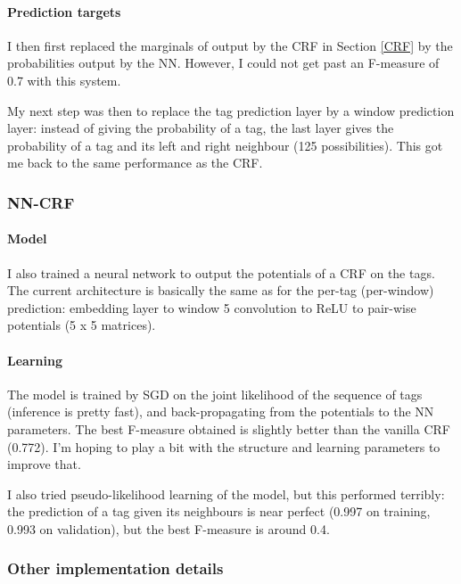 \documentclass[10pt,a4paper]{article}
\begin{document}
  \paragraph{Prediction targets}

  I then first replaced the marginals of output by the CRF in Section \ref{CRF} by the probabilities output by the NN. However, I could not get past an F-measure of 0.7 with this system.
  
  My next step was then to replace the tag prediction layer by a window prediction layer: instead of giving the probability of a tag, the last layer gives the probability of a tag and its left and right neighbour (125 possibilities). This got me back to the same performance as the CRF.

\subsubsection{NN-CRF}

  \paragraph{Model}

  I also trained a neural network to output the potentials of a CRF on the tags. The current architecture is basically the same as for the per-tag (per-window) prediction: embedding layer to window 5 convolution to ReLU to pair-wise potentials (5 x 5 matrices).

  \paragraph{Learning} The model is trained by SGD on the joint likelihood of the sequence of tags (inference is pretty fast), and back-propagating from the potentials to the NN parameters. The best F-measure obtained is slightly better than the vanilla CRF (0.772). I'm hoping to play a bit with the structure and learning parameters to improve that.
  
  I also tried pseudo-likelihood learning of the model, but this performed terribly: the prediction of a tag given its neighbours is near perfect (0.997 on training, 0.993 on validation), but the best F-measure is around 0.4.

\subsubsection{Other implementation details}
\end{document}
